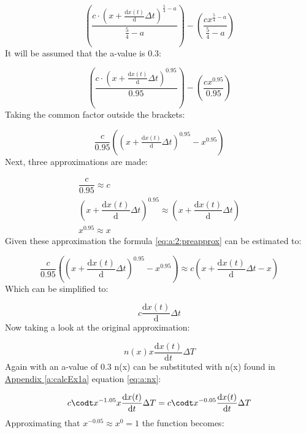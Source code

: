 \documentclass{article}
\numberwithin{equation}{section} %
\newcommand{\md}{\mathrm{d}}
\begin{document}
\begin{equation}
	\left(
	    \dfrac{c\cdot\left(
	        x+\tfrac{\md x(t)}{\md }\Delta t
	    \right)^{\tfrac{5}{4}-a}}{\tfrac{5}{4}-a}
	\right)-\left(
	    \dfrac{cx^{\tfrac{5}{4}-a}}{\tfrac{5}{4}-a}
	\right)
\end{equation}
It will be assumed that the a-value is 0.3:

\begin{equation}
	\left(
	    \dfrac{c\cdot\left(
	        x+\tfrac{\md x(t)}{\md }\Delta t
	    \right)^{0.95}}{0.95}
	\right)-\left(
	    \dfrac{cx^{0.95}}{0.95}
	\right)
\end{equation}
Taking the common factor outside the brackets:

\begin{equation}\label{eq:a:2:preapprox}
    \dfrac{c}{0.95}\left(
        \left(
            x+\tfrac{\md x(t)}{\md }\Delta t
        \right)^{0.95}-x^{0.95}
    \right)
\end{equation}
Next, three approximations are made:

\begin{gather}
    \dfrac{c}{0.95}\approx c\\
    \left(
            x+\dfrac{\md x(t)}{\md }\Delta t
        \right)^{0.95} \approx
    \left(
        x+\dfrac{\md x(t)}{\md }\Delta t
    \right)\\
    x^{0.95} \approx x
\end{gather}
Given these approximation the formula \ref{eq:a:2:preapprox} can be estimated to:

\begin{equation}
	\dfrac{c}{0.95}\left(
        \left(
            x+\dfrac{\md x(t)}{\md }\Delta t
        \right)^{0.95}-x^{0.95}
    \right)
    \approx
    c\left(   
        x+\dfrac{\md x(t)}{\md }\Delta t-x
    \right)
\end{equation}
Which can be simplified to:

\begin{equation}\label{eq:a:2:approxDone}
	c\dfrac{\md x(t)}{\md }\Delta t
\end{equation}
Now taking a look at the original approximation:

\begin{equation}
	n(x)x\dfrac{\md x(t)}{\md t}\Delta T
\end{equation}
Again with an a-value of 0.3 n(x) can be substituted with n(x) found in \hyperref[a:calcEx1a]{Appendix \ref{a:calcEx1a}} equation \ref{eq:a:nx}:

\begin{equation}
	c\codt x^{-1.05}x\dfrac{\md x(t)}{\md t}\Delta T = c\codt x^{-0.05}\dfrac{\md x(t)}{\md t}\Delta T
\end{equation}
Approximating that $x^{-0.05}\approx x^0=1$ the function becomes:
\end{document}
